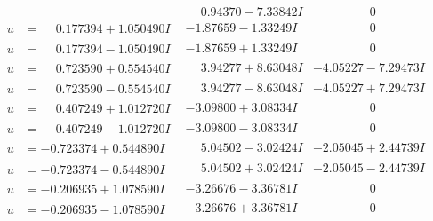\documentclass[1p]{elsarticle_modified}
\theoremstyle{definition}
\begin{document}
$$\begin{array}{c|c|c}
 & \phantom{-}0.94370 - 7.33842 I & \phantom{-0.000000 } 0 \\ \hline\begin{aligned}
u &= \phantom{-}0.177394 + 1.050490 I\end{aligned}
 & -1.87659 - 1.33249 I & \phantom{-0.000000 } 0 \\ \hline\begin{aligned}
u &= \phantom{-}0.177394 - 1.050490 I\end{aligned}
 & -1.87659 + 1.33249 I & \phantom{-0.000000 } 0 \\ \hline\begin{aligned}
u &= \phantom{-}0.723590 + 0.554540 I\end{aligned}
 & \phantom{-}3.94277 + 8.63048 I & -4.05227 - 7.29473 I \\ \hline\begin{aligned}
u &= \phantom{-}0.723590 - 0.554540 I\end{aligned}
 & \phantom{-}3.94277 - 8.63048 I & -4.05227 + 7.29473 I \\ \hline\begin{aligned}
u &= \phantom{-}0.407249 + 1.012720 I\end{aligned}
 & -3.09800 + 3.08334 I & \phantom{-0.000000 } 0 \\ \hline\begin{aligned}
u &= \phantom{-}0.407249 - 1.012720 I\end{aligned}
 & -3.09800 - 3.08334 I & \phantom{-0.000000 } 0 \\ \hline\begin{aligned}
u &= -0.723374 + 0.544890 I\end{aligned}
 & \phantom{-}5.04502 - 3.02424 I & -2.05045 + 2.44739 I \\ \hline\begin{aligned}
u &= -0.723374 - 0.544890 I\end{aligned}
 & \phantom{-}5.04502 + 3.02424 I & -2.05045 - 2.44739 I \\ \hline\begin{aligned}
u &= -0.206935 + 1.078590 I\end{aligned}
 & -3.26676 - 3.36781 I & \phantom{-0.000000 } 0 \\ \hline\begin{aligned}
u &= -0.206935 - 1.078590 I\end{aligned}
 & -3.26676 + 3.36781 I & \phantom{-0.000000 } 0 \\ \hline\begin{aligned}

\end{aligned}
\end{array}$$
\end{document}
